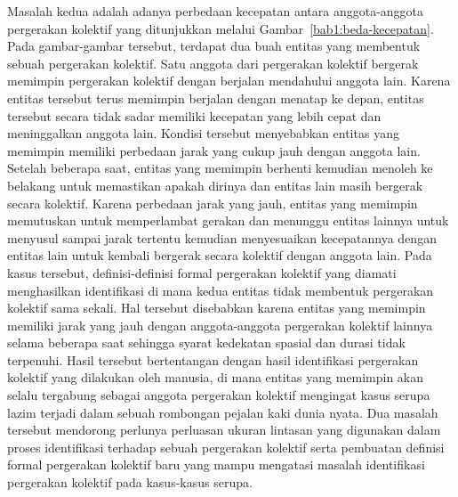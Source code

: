 Masalah kedua adalah adanya perbedaan kecepatan antara anggota-anggota pergerakan kolektif yang ditunjukkan melalui Gambar~\ref{bab1:beda-kecepatan}. Pada gambar-gambar tersebut, terdapat dua buah entitas yang membentuk sebuah pergerakan kolektif. Satu anggota dari pergerakan kolektif bergerak memimpin pergerakan kolektif dengan berjalan mendahului anggota lain. Karena entitas tersebut terus memimpin berjalan dengan menatap ke depan, entitas tersebut secara tidak sadar memiliki kecepatan yang lebih cepat dan meninggalkan anggota lain. Kondisi tersebut menyebabkan entitas yang memimpin memiliki perbedaan jarak yang cukup jauh dengan anggota lain. Setelah beberapa saat, entitas yang memimpin berhenti kemudian menoleh ke belakang untuk memastikan apakah dirinya dan entitas lain masih bergerak secara kolektif. Karena perbedaan jarak yang jauh, entitas yang memimpin memutuskan untuk memperlambat gerakan dan menunggu entitas lainnya untuk menyusul sampai jarak tertentu kemudian menyesuaikan kecepatannya dengan entitas lain untuk kembali bergerak secara kolektif dengan anggota lain. Pada kasus tersebut, definisi-definisi formal pergerakan kolektif yang diamati menghasilkan identifikasi di mana kedua entitas tidak membentuk pergerakan kolektif sama sekali. Hal tersebut disebabkan karena entitas yang memimpin memiliki jarak yang jauh dengan anggota-anggota pergerakan kolektif lainnya selama beberapa saat sehingga syarat kedekatan spasial dan durasi tidak terpenuhi. Hasil tersebut bertentangan dengan hasil identifikasi pergerakan kolektif yang dilakukan oleh manusia, di mana entitas yang memimpin akan selalu tergabung sebagai anggota pergerakan kolektif mengingat kasus serupa lazim terjadi dalam sebuah rombongan pejalan kaki dunia nyata. Dua masalah tersebut mendorong perlunya perluasan ukuran lintasan yang digunakan dalam proses identifikasi terhadap sebuah pergerakan kolektif serta pembuatan definisi formal pergerakan kolektif baru yang mampu mengatasi masalah identifikasi pergerakan kolektif pada kasus-kasus serupa. 

